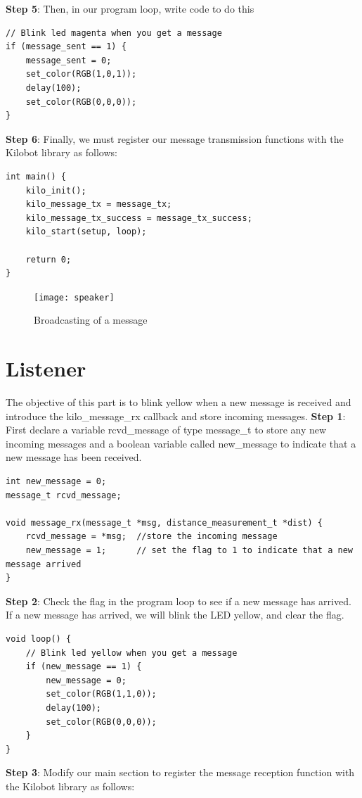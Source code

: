 \noindent \textbf{Step 5}:
Then, in our program loop, write code to do this

\begin{verbatim}
// Blink led magenta when you get a message
if (message_sent == 1) {
    message_sent = 0;
    set_color(RGB(1,0,1));
    delay(100);
    set_color(RGB(0,0,0));
}
\end{verbatim}

\noindent \textbf{Step 6}:
Finally, we must register our message transmission functions with the Kilobot library as follows:
\begin{verbatim}
int main() {
    kilo_init();
    kilo_message_tx = message_tx;
    kilo_message_tx_success = message_tx_success;
    kilo_start(setup, loop);

    return 0;
}

\end{verbatim}

\begin{figure}[H]
\begin{center}
\texttt{[image: speaker]}
\caption{Broadcasting of a message}
\end{center}
\end{figure} 

\section{Listener}
The objective of this part is to blink yellow when a new message is received and introduce the kilo\_message\_rx callback and store incoming messages.
\newline
\newline
\noindent \textbf{Step 1}:
First declare a variable rcvd\_message of type message\_t to store any new incoming messages and a boolean variable called new\_message to indicate that a new message has been received.
\begin{verbatim}
int new_message = 0;
message_t rcvd_message;

void message_rx(message_t *msg, distance_measurement_t *dist) {
    rcvd_message = *msg;  //store the incoming message
    new_message = 1;      // set the flag to 1 to indicate that a new message arrived
}
\end{verbatim}

\noindent \textbf{Step 2}:
Check the flag in the program loop to see if a new message has arrived. If a new message has arrived, we will blink the LED yellow, and clear the flag.

\begin{verbatim}
void loop() {
    // Blink led yellow when you get a message
    if (new_message == 1) {
        new_message = 0;
        set_color(RGB(1,1,0));
        delay(100);
        set_color(RGB(0,0,0));
    }
}
\end{verbatim}
\noindent \textbf{Step 3}:
Modify our main section to register the message reception function with the Kilobot library as follows:

